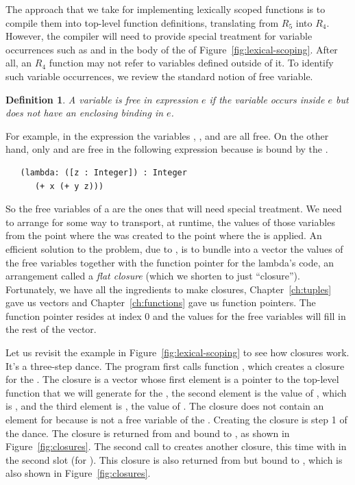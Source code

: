 \documentclass[11pt]{book}
\newtheorem{definition}[theorem]{Definition}
\begin{document}
The approach that we take for implementing lexically scoped
functions is to compile them into top-level function definitions,
translating from $R_5$ into $R_4$.  However, the compiler will need to
provide special treatment for variable occurrences such as 
and  in the body of the  of
Figure~\ref{fig:lexical-scoping}. After all, an $R_4$ function may not
refer to variables defined outside of it. To identify such variable
occurrences, we review the standard notion of free variable.

\begin{definition}
A variable is \emph{free in expression} $e$ if the variable occurs
inside $e$ but does not have an enclosing binding in $e$.
\end{definition}

For example, in the expression  the variables
, , and  are all free.  On the other hand,
only  and  are free in the following expression
because  is bound by the .
\begin{lstlisting}
   (lambda: ([z : Integer]) : Integer
      (+ x (+ y z)))
\end{lstlisting}

So the free variables of a  are the ones that will need
special treatment. We need to arrange for some way to transport, at
runtime, the values of those variables from the point where the
 was created to the point where the  is
applied. An efficient solution to the problem, due to
\citet{Cardelli:1983aa}, is to bundle into a vector the values of the
free variables together with the function pointer for the lambda's
code, an arrangement called a \emph{flat closure} (which we shorten to
just ``closure'').   Fortunately,
we have all the ingredients to make closures, Chapter~\ref{ch:tuples}
gave us vectors and Chapter~\ref{ch:functions} gave us function
pointers. The function pointer resides at index $0$ and the
values for the free variables will fill in the rest of the vector.

Let us revisit the example in Figure~\ref{fig:lexical-scoping} to see
how closures work. It's a three-step dance. The program first calls
function , which creates a closure for the . The
closure is a vector whose first element is a pointer to the top-level
function that we will generate for the , the second
element is the value of , which is , and the third
element is , the value of . The closure does not
contain an element for  because  is not a free
variable of the . Creating the closure is step 1 of the
dance. The closure is returned from  and bound to , as
shown in Figure~\ref{fig:closures}.
%
The second call to  creates another closure, this time with
 in the second slot (for ). This closure is also
returned from  but bound to , which is also shown in
Figure~\ref{fig:closures}.
\end{document}
